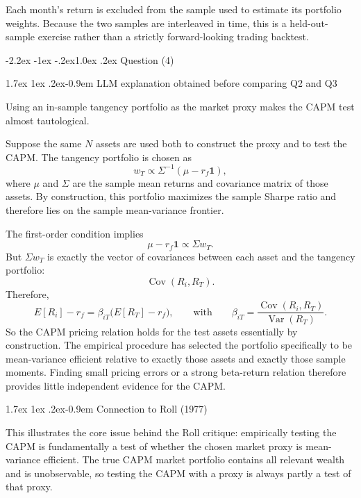 \documentclass[11pt]{article}
\makeatletter
\renewcommand\subsection{\@startsection{subsection}{2}{0pt}%
  {-2.2ex \@plus -1ex \@minus -.2ex}{1.0ex \@plus .2ex}%
  {\normalfont\bfseries\normalsize\color{psink}}}
\renewcommand\paragraph{\@startsection{paragraph}{4}{0pt}%
  {1.7ex \@plus 1ex \@minus .2ex}{-0.9em}%
  {\normalfont\bfseries\normalsize\color{psink}}}
\makeatother
\begin{document}
Each month's return is excluded from the sample used to estimate its portfolio
weights. Because the two samples are interleaved in time, this is a
held-out-sample exercise rather than a strictly forward-looking trading
backtest.

\subsection{Question (4)}

\paragraph{LLM explanation obtained before comparing Q2 and Q3}

Using an in-sample tangency portfolio as the market proxy makes the CAPM test
almost tautological.

Suppose the same \(N\) assets are used both to construct the proxy and to test
the CAPM. The tangency portfolio is chosen as
\[
w_T \propto \Sigma^{-1}(\mu-r_f\mathbf{1}),
\]
where \(\mu\) and \(\Sigma\) are the sample mean returns and covariance matrix
of those assets. By construction, this portfolio maximizes the sample Sharpe
ratio and therefore lies on the sample mean-variance frontier.

The first-order condition implies
\[
\mu-r_f\mathbf{1} \propto \Sigma w_T.
\]
But \(\Sigma w_T\) is exactly the vector of covariances between each asset and
the tangency portfolio:
\[
\operatorname{Cov}(R_i,R_T).
\]
Therefore,
\[
E[R_i]-r_f = \beta_{iT}\big(E[R_T]-r_f\big),
\qquad\text{with}\qquad
\beta_{iT} = \frac{\operatorname{Cov}(R_i,R_T)}{\operatorname{Var}(R_T)}.
\]
So the CAPM pricing relation holds for the test assets essentially by
construction. The empirical procedure has selected the portfolio specifically
to be mean-variance efficient relative to exactly those assets and exactly
those sample moments. Finding small pricing errors or a strong beta-return
relation therefore provides little independent evidence for the CAPM.

\paragraph{Connection to Roll (1977)}

This illustrates the core issue behind the Roll critique: empirically testing
the CAPM is fundamentally a test of whether the chosen market proxy is
mean-variance efficient. The true CAPM market portfolio contains all relevant
wealth and is unobservable, so testing the CAPM with a proxy is always partly a
test of that proxy.
\end{document}
